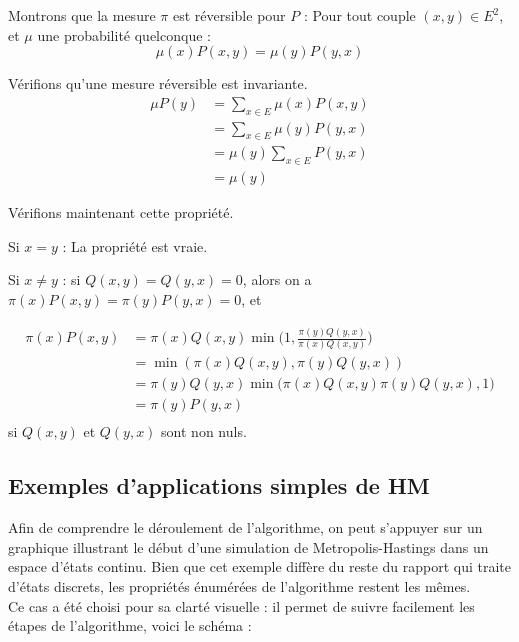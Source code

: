 \documentclass{article}
\begin{document}
\begin{tcolorbox}[colback=white,colframe=green!80!black,title=Démonstration]
    Montrons que la mesure $\pi$ est réversible pour $P$ :
    Pour tout couple $(x, y) \in E^2$, et $\mu$ une probabilité quelconque :
    $$
        \mu(x)P(x, y) = \mu(y) P(y, x)
    $$

    Vérifions qu’une mesure réversible est invariante. 
    \begin{align*}
        \mu P(y) &= \sum_{x \in E}{\mu(x) P(x, y)}\\
        &= \sum_{x \in E}{\mu(y) P(y, x)}\\
        &= \mu(y) \sum_{x \in E}{P(y, x)}\\
        &= \mu(y)
    \end{align*}

    Vérifions maintenant cette propriété.

    Si $x = y$ : La propriété est vraie.

    Si $x \neq y$ :
    si $Q(x, y) = Q(y, x) = 0$, alors on a $\pi(x)P(x, y) = \pi(y)P(y, x) = 0$, et

    \begin{align*}
        \pi(x)P(x, y) &= \pi(x)Q(x, y)\min\Big(1, \frac{\pi(y)Q(y, x)}{\pi(x)Q(x, y)}\Big)\\
        &= \min(\pi(x)Q(x, y), \pi(y)Q(y, x))\\
        &= \pi(y)Q(y, x )\min\Big(\pi(x)Q(x, y)\pi(y)Q(y, x), 1)\\
        &= \pi(y)P(y, x)\\
    \end{align*}
    si $Q(x, y)$ et $Q(y, x)$ sont non nuls.
\end{tcolorbox}

\subsection{Exemples d'applications simples de HM} %

Afin de comprendre le déroulement de l'algorithme, on peut s'appuyer sur un graphique illustrant le début d'une simulation de Metropolis-Hastings dans un espace d'états continu. Bien que cet exemple diffère du reste du rapport qui traite d'états discrets, les propriétés énumérées de l'algorithme restent les mêmes. \\
Ce cas a été choisi pour sa clarté visuelle : il permet de suivre facilement les étapes de l'algorithme, voici le schéma : \\
\end{document}
